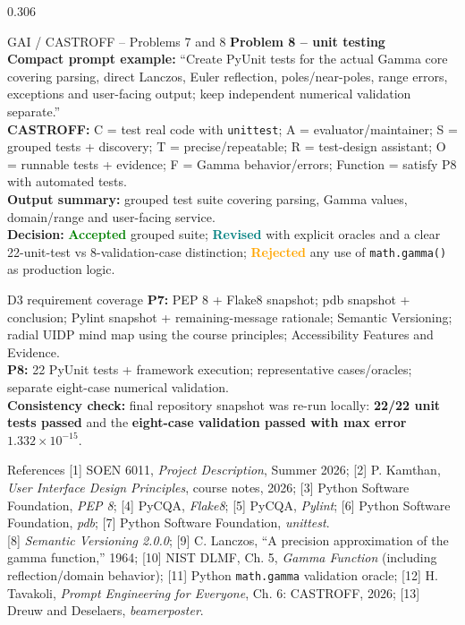 \documentclass[final]{beamer}
\begin{document}
\begin{frame}[t]
\begin{columns}[T,totalwidth=0.970\textwidth]
\begin{column}{0.306\textwidth}
\begin{alertblock}{GAI / CASTROFF -- Problems 7 and 8}
\vspace{0.10cm}
\textbf{Problem 8 -- unit testing}\\
\textbf{Compact prompt example:} ``Create PyUnit tests for the actual Gamma core covering parsing, direct Lanczos, Euler reflection, poles/near-poles, range errors, exceptions and user-facing output; keep independent numerical validation separate.''\\
\textbf{CASTROFF:} C = test real code with \texttt{unittest}; A = evaluator/maintainer; S = grouped tests + discovery; T = precise/repeatable; R = test-design assistant; O = runnable tests + evidence; F = Gamma behavior/errors; Function = satisfy P8 with automated tests.\\
\textbf{Output summary:} grouped test suite covering parsing, Gamma values, domain/range and user-facing service.\\
\textbf{Decision:} \textcolor{Green}{\bfseries Accepted} grouped suite; \textcolor{Teal}{\bfseries Revised} with explicit oracles and a clear 22-unit-test vs 8-validation-case distinction; \textcolor{Orange}{\bfseries Rejected} any use of \texttt{math.gamma()} as production logic.
\end{alertblock}

\vspace{0.14cm}
\begin{block}{D3 requirement coverage}
\scriptsize
\textbf{P7:} PEP 8 + Flake8 snapshot; pdb snapshot + conclusion; Pylint snapshot + remaining-message rationale; Semantic Versioning; radial UIDP mind map using the course principles; Accessibility Features and Evidence.\\
\textbf{P8:} 22 PyUnit tests + framework execution; representative cases/oracles; separate eight-case numerical validation.\\
\textbf{Consistency check:} final repository snapshot was re-run locally: \textbf{22/22 unit tests passed} and the \textbf{eight-case validation passed with max error $1.332\times10^{-15}$}.
\end{block}

\vspace{0.14cm}
\begin{block}{References}
\small
[1] SOEN 6011, \emph{Project Description}, Summer 2026; [2] P. Kamthan, \emph{User Interface Design Principles}, course notes, 2026; [3] Python Software Foundation, \emph{PEP 8}; [4] PyCQA, \emph{Flake8}; [5] PyCQA, \emph{Pylint}; [6] Python Software Foundation, \emph{pdb}; [7] Python Software Foundation, \emph{unittest}.\\[0.05cm]
[8] \emph{Semantic Versioning 2.0.0}; [9] C. Lanczos, ``A precision approximation of the gamma function,'' 1964; [10] NIST DLMF, Ch. 5, \emph{Gamma Function} (including reflection/domain behavior); [11] Python \texttt{math.gamma} validation oracle; [12] H. Tavakoli, \emph{Prompt Engineering for Everyone}, Ch. 6: CASTROFF, 2026; [13] Dreuw and Deselaers, \emph{beamerposter}.
\end{block}
\end{column}
\end{columns}

\end{frame}
\end{document}
